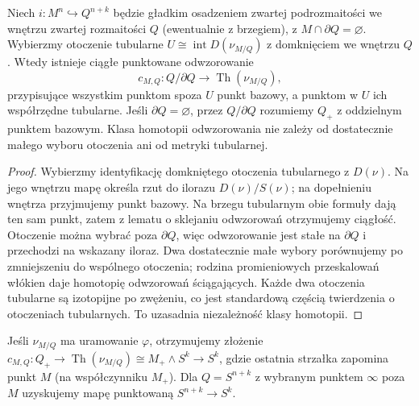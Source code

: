 \begin{lemat}
\label{lem:pt-collapse-v9}
Niech $i:M^n\hookrightarrow Q^{n+k}$ będzie gładkim
osadzeniem zwartej podrozmaitości we wnętrzu zwartej
rozmaitości $Q$ (ewentualnie z brzegiem), z
$M\cap\partial Q=\varnothing$. Wybierzmy otoczenie tubularne
$U\cong \operatorname{int}D(\nu_{M/Q})$ z domknięciem
we wnętrzu $Q$. Wtedy istnieje ciągłe punktowane
odwzorowanie
\[
c_{M,Q}: Q/\partial Q\longrightarrow
\operatorname{Th}(\nu_{M/Q}),
\]
przypisujące wszystkim punktom spoza $U$ punkt bazowy,
a punktom w $U$ ich współrzędne tubularne. Jeśli
$\partial Q=\varnothing$, przez $Q/\partial Q$ rozumiemy
$Q_+$ z oddzielnym punktem bazowym. Klasa homotopii
odwzorowania nie zależy od dostatecznie małego
wyboru otoczenia ani od metryki tubularnej.
\end{lemat}
\begin{proof}
Wybierzmy identyfikację domkniętego otoczenia
tubularnego z $D(\nu)$. Na jego wnętrzu mapę określa
rzut do ilorazu $D(\nu)/S(\nu)$; na dopełnieniu
wnętrza przyjmujemy punkt bazowy. Na brzegu tubularnym
obie formuły dają ten sam punkt, zatem z lematu o
sklejaniu odwzorowań otrzymujemy ciągłość.
Otoczenie można wybrać poza $\partial Q$, więc
odwzorowanie jest stałe na $\partial Q$ i przechodzi
na wskazany iloraz. Dwa dostatecznie małe wybory
porównujemy po zmniejszeniu do wspólnego otoczenia;
rodzina promieniowych przeskalowań włókien daje
homotopię odwzorowań ściągających. Każde dwa
otoczenia tubularne są izotopijne po zwężeniu,
co jest standardową częścią twierdzenia o otoczeniach
tubularnych. To uzasadnia niezależność klasy homotopii.
\end{proof}

Jeśli $\nu_{M/Q}$ ma uramowanie $\varphi$, otrzymujemy
złożenie
$c_{M,Q}:Q_+\to\operatorname{Th}(\nu_{M/Q})
\cong M_+\wedge S^k\to S^k$, gdzie ostatnia strzałka
zapomina punkt $M$ (na współczynniku $M_+$).
Dla $Q=S^{n+k}$ z wybranym punktem $\infty$ poza $M$
uzyskujemy mapę punktowaną $S^{n+k}\to S^k$.

